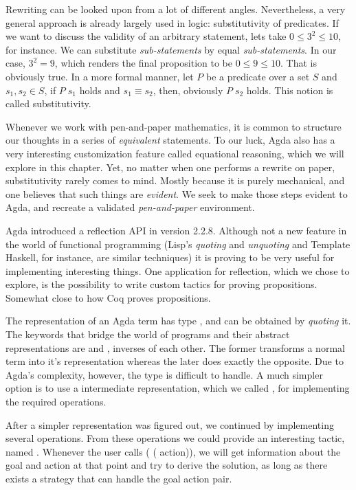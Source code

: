 Rewriting can be looked upon from a lot of different angles. Nevertheless, a very general approach
is already largely used in logic: substitutivity of predicates. If we want to discuss
the validity of an arbitrary statement, lets take $0 \leq 3^2 \leq 10$, for instance. We can
substitute \emph{sub-statements} by equal \emph{sub-statements}. In our case, $3^2 = 9$,
which renders the final proposition to be $0 \leq 9 \leq 10$. That is obviously true.
In a more formal manner, let $P$ be a predicate
over a set $S$ and $s_1, s_2 \in S$, if $P\;s_1$ holds and $s_1 \equiv s_2$, then, obviously
$P\;s_2$ holds. This notion is called substitutivity.

Whenever we work with pen-and-paper mathematics, it is common to structure our thoughts
in a series of \emph{equivalent} statements. To our luck, Agda also has a very interesting
customization feature called equational reasoning, which we will explore in this chapter.
Yet, no matter when one performs a rewrite on paper, substitutivity rarely comes to mind.
Mostly because it is purely mechanical, and one believes that such things are \emph{evident}.
We seek to make those steps evident to Agda, and recreate a validated \emph{pen-and-paper}
environment.

Agda introduced a reflection API in version 2.2.8. Although not a new feature
in the world of functional programming (Lisp's \emph{quoting} and \emph{unquoting} 
and Template Haskell, for instance, are similar techniques) 
it is proving to be very useful for implementing interesting things. 
One application for reflection, which we chose to explore, is 
the possibility to write custom tactics for proving propositions. 
Somewhat close to how Coq proves propositions.

The representation of an Agda term has type , and can be obtained
by \emph{quoting} it.
The keywords that bridge the world of programs and their abstract representations 
are  and , inverses of each other. 
The former transforms a normal term into it's  representation whereas the 
later does exactly the opposite. Due to Agda's complexity, however, the type  is difficult
to handle. A much simpler option is to use a intermediate representation, which we called ,
for implementing the required operations.

After a simpler representation was figured out, we continued by implementing several
 operations. From these operations we could provide an interesting tactic,
named . Whenever the user calls ( ( action)), we will get information
about the goal and action at that point and try to derive the solution, as long as there exists
a strategy that can handle the goal action pair.

